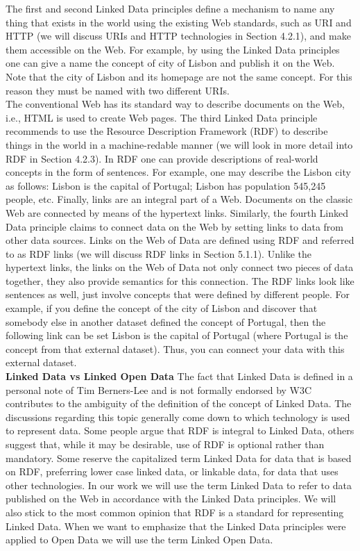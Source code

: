 \documentclass[a4paper,12pt,oneside]{report}
\begin{document}
{{{{The first and second Linked Data principles define a mechanism to name any thing that exists in the world using the existing Web standards, such as URI and HTTP (we will discuss URIs and HTTP technologies in Section 4.2.1), and make them accessible
on the Web. For example, by using the Linked Data principles one can give a name the concept of city of Lisbon and publish it on the Web. Note that the city of Lisbon and its homepage are not the same concept. For this reason they must be named with two
different URIs.\\
The conventional Web has its standard way to describe documents on the Web, i.e., HTML is used to create Web pages. The third Linked Data principle recommends to use the Resource Description Framework (RDF) to describe things in the world in a machine-redable manner (we will look in more detail into RDF in Section 4.2.3). In RDF one can provide descriptions of real-world concepts in the form of sentences. For example, one may describe the Lisbon city as follows: Lisbon is the capital of Portugal; Lisbon has population 545,245 people, etc.
Finally, links are an integral part of a Web. Documents on the classic Web are connected by means of the hypertext links. Similarly, the fourth Linked Data principle claims to connect data on the Web by setting links to data from other data sources.
Links on the Web of Data are defined using RDF and referred to as RDF links (we will discuss RDF links in Section 5.1.1). Unlike the hypertext links, the links on the Web
of Data not only connect two pieces of data together, they also provide semantics for this connection. The RDF links look like sentences as well, just involve concepts that
were defined by different people. For example, if you define the concept of the city of
Lisbon and discover that somebody else in another dataset defined the concept of Portugal, then the following link can be set Lisbon is the capital of Portugal (where Portugal is the concept from that external dataset). Thus, you can connect your data with this
external dataset.\\
\textbf{Linked Data vs Linked Open Data} The fact that Linked Data is defined in a personal note of Tim Berners-Lee and is not formally endorsed by W3C contributes to the ambiguity of the definition of the concept of Linked Data. The discussions regarding this
topic generally come down to which technology is used to represent data. Some people argue that RDF is integral to Linked Data, others suggest that, while it may be desirable, use of RDF is optional rather than mandatory. Some reserve the capitalized term
Linked Data for data that is based on RDF, preferring lower case linked data, or linkable data, for data that uses other technologies. In our work we will use the term Linked Data
to refer to data published on the Web in accordance with the Linked Data principles. We will also stick to the most common opinion that RDF is a standard for representing Linked Data. When we want to emphasize that the Linked Data principles were
applied to Open Data we will use the term Linked Open Data.}









}}}
\end{document}
